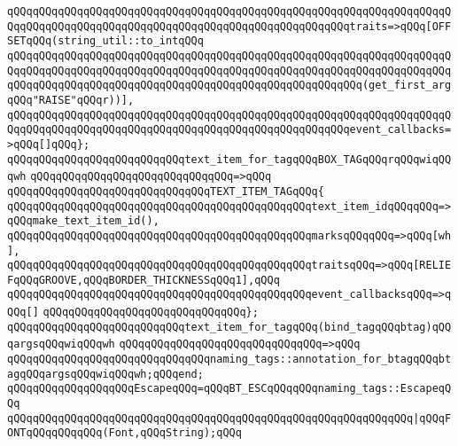 \verb|qQQqqQQqqQQqqQQqqQQqqQQqqQQqqQQqqQQqqQQqqQQqqQQqqQQqqQQqqQQqqQQqqQQqqQQqqQQqqQQqqQQqqQQqqQQqqQQqqQQqqQQqqQQqqQQqqQQqqQQqqQQqtraits=>qQQq[OFFSETqQQq(string_util::to_intqQQq|\newline
\verb|qQQqqQQqqQQqqQQqqQQqqQQqqQQqqQQqqQQqqQQqqQQqqQQqqQQqqQQqqQQqqQQqqQQqqQQqqQQqqQQqqQQqqQQqqQQqqQQqqQQqqQQqqQQqqQQqqQQqqQQqqQQqqQQqqQQqqQQqqQQqqQQqqQQqqQQqqQQqqQQqqQQqqQQqqQQqqQQqqQQqqQQqqQQqqQQqqQQq(get_first_argqQQq"RAISE"qQQqr))],|\newline
\newline
\verb|qQQqqQQqqQQqqQQqqQQqqQQqqQQqqQQqqQQqqQQqqQQqqQQqqQQqqQQqqQQqqQQqqQQqqQQqqQQqqQQqqQQqqQQqqQQqqQQqqQQqqQQqqQQqqQQqqQQqqQQqqQQqevent_callbacks=>qQQq[]qQQq};|\newline
\newline
\verb|qQQqqQQqqQQqqQQqqQQqqQQqqQQqtext_item_for_tagqQQqBOX_TAGqQQqrqQQqwiqQQqwh|\newline
\verb|qQQqqQQqqQQqqQQqqQQqqQQqqQQqqQQq=>qQQq|\newline
\verb|qQQqqQQqqQQqqQQqqQQqqQQqqQQqqQQqTEXT_ITEM_TAGqQQq{|\newline
\verb|qQQqqQQqqQQqqQQqqQQqqQQqqQQqqQQqqQQqqQQqqQQqqQQqtext_item_idqQQqqQQq=>qQQqmake_text_item_id(),|\newline
\verb|qQQqqQQqqQQqqQQqqQQqqQQqqQQqqQQqqQQqqQQqqQQqqQQqmarksqQQqqQQq=>qQQq[wh],|\newline
\verb|qQQqqQQqqQQqqQQqqQQqqQQqqQQqqQQqqQQqqQQqqQQqqQQqtraitsqQQq=>qQQq[RELIEFqQQqGROOVE,qQQqBORDER_THICKNESSqQQq1],qQQq|\newline
\verb|qQQqqQQqqQQqqQQqqQQqqQQqqQQqqQQqqQQqqQQqqQQqqQQqevent_callbacksqQQq=>qQQq[]|\newline
\verb|qQQqqQQqqQQqqQQqqQQqqQQqqQQqqQQq};|\newline
\newline
\verb|qQQqqQQqqQQqqQQqqQQqqQQqqQQqtext_item_for_tagqQQq(bind_tagqQQqbtag)qQQqargsqQQqwiqQQqwh|\newline
\verb|qQQqqQQqqQQqqQQqqQQqqQQqqQQqqQQq=>qQQq|\newline
\verb|qQQqqQQqqQQqqQQqqQQqqQQqqQQqqQQqnaming_tags::annotation_for_btagqQQqbtagqQQqargsqQQqwiqQQqwh;qQQqend;|\newline
\newline
\newline
\verb|qQQqqQQqqQQqqQQqqQQqEscapeqQQq=qQQqBT_ESCqQQqqQQqnaming_tags::EscapeqQQq|\newline
\verb|qQQqqQQqqQQqqQQqqQQqqQQqqQQqqQQqqQQqqQQqqQQqqQQqqQQqqQQqqQQqqQQq|\verb#|qQQqFONTqQQqqQQqqQQq(Font,qQQqString);qQQq#\newline
